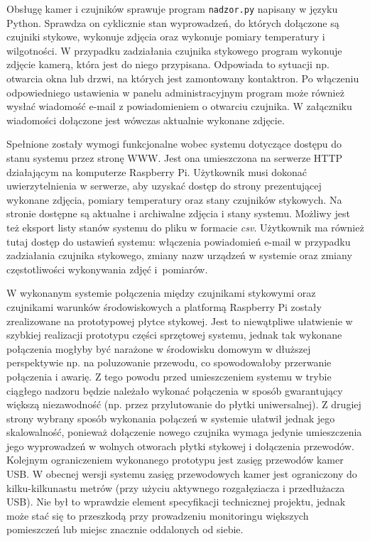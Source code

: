 \documentclass[a4paper,11pt,twoside]{article}
\begin{document}
Obsługę kamer i czujników sprawuje program \texttt{nadzor.py} napisany w języku Python. Sprawdza on cyklicznie stan wyprowadzeń, do których dołączone są czujniki stykowe, wykonuje zdjęcia oraz wykonuje pomiary temperatury i wilgotności. W przypadku zadziałania czujnika stykowego program wykonuje zdjęcie kamerą, która jest do niego przypisana. Odpowiada to sytuacji np. otwarcia okna lub drzwi, na których jest zamontowany kontaktron. Po włączeniu odpowiedniego ustawienia w panelu administracyjnym program może również wysłać wiadomość e-mail z powiadomieniem o otwarciu czujnika. W załączniku wiadomości dołączone jest wówczas aktualnie wykonane zdjęcie.

Spełnione zostały wymogi funkcjonalne wobec systemu dotyczące dostępu do stanu systemu przez stronę WWW. Jest ona umieszczona na serwerze HTTP działającym na komputerze Raspberry Pi. Użytkownik musi dokonać uwierzytelnienia w serwerze, aby uzyskać dostęp do strony prezentującej wykonane zdjęcia, pomiary temperatury oraz stany czujników stykowych. Na stronie dostępne są aktualne i archiwalne zdjęcia i stany systemu. Możliwy jest też eksport listy stanów systemu do pliku w formacie \textit{csv}. Użytkownik ma również tutaj dostęp do ustawień systemu: włączenia powiadomień e-mail w przypadku zadziałania czujnika stykowego, zmiany nazw urządzeń w systemie oraz zmiany częstotliwości wykonywania zdjęć i~pomiarów.

W wykonanym systemie połączenia między czujnikami stykowymi oraz czujnikami warunków środowiskowych a platformą Raspberry Pi zostały zrealizowane na prototypowej płytce stykowej. Jest to niewątpliwe ułatwienie w szybkiej realizacji prototypu części sprzętowej systemu, jednak tak wykonane połączenia mogłyby być narażone w środowisku domowym w dłuższej perspektywie np. na poluzowanie przewodu, co spowodowałoby przerwanie połączenia i awarię. Z tego powodu przed umieszczeniem systemu w trybie ciągłego nadzoru będzie należało wykonać połączenia w sposób gwarantujący większą niezawodność (np. przez przylutowanie do płytki uniwersalnej). Z drugiej strony wybrany sposób wykonania połączeń w systemie ułatwił jednak jego skalowalność, ponieważ dołączenie nowego czujnika wymaga jedynie umieszczenia jego wyprowadzeń w wolnych otworach płytki stykowej i dołączenia przewodów. Kolejnym ograniczeniem wykonanego prototypu jest zasięg przewodów kamer USB. W obecnej wersji systemu zasięg przewodowych kamer jest ograniczony do kilku-kilkunastu metrów (przy użyciu aktywnego rozgałęziacza i przedłużacza USB). Nie był to wprawdzie element specyfikacji technicznej projektu, jednak może stać się to przeszkodą przy prowadzeniu monitoringu większych pomieszczeń lub miejsc znacznie oddalonych od siebie.
\end{document}
